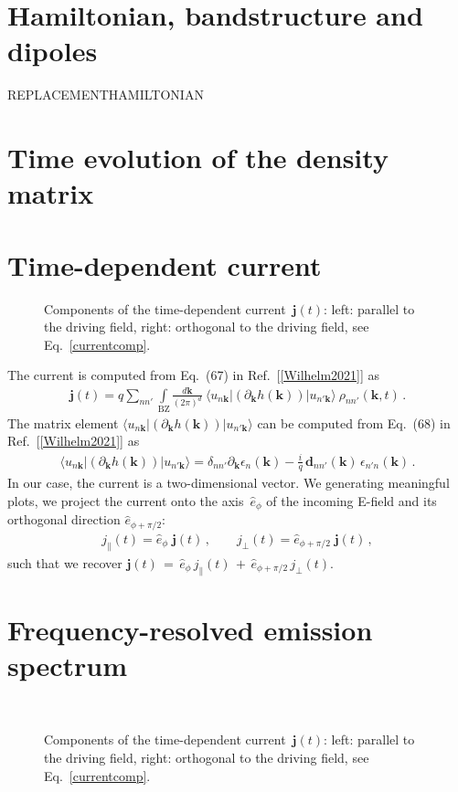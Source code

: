 \documentclass[11pt, a4paper]{scrartcl}
\newlength\figureheight
\newlength\figurewidth
\newcommand{\bk}{\mathbf{k}}
\newcommand{\bj}{\mathbf{j}}
\newcommand{\bd}{\mathbf{d}}
\newcommand{\eqt}{\,{=}\,}
\newcommand{\pt}{\,{+}\,}
\newcommand{\intbzdkpi}{\int\limits_\text{BZ}\frac{d\bk}{(2\pi)^d}}
\begin{document}
\newpage
\section{Hamiltonian, bandstructure and dipoles}
REPLACEMENTHAMILTONIAN


\section{Time evolution of the density matrix}

\section{Time-dependent current}
\begin{figure}[b!]
\centering
\setlength\figureheight{7.5cm} 
\setlength\figurewidth{7.5cm}
\hfill
\caption{Components of the time-dependent current~$\bj(t)$: left: parallel to the driving field, right: orthogonal to the driving field, see Eq.~\eqref{currentcomp}.}
    \label{fig:current}
\end{figure}
The current is computed from Eq.~(67) in Ref.~[\ref{Wilhelm2021}] as
\begin{align}
 \bj(t)  =
q\sum_{nn'} \intbzdkpi
\ \langle u_{n\bk} |  (\partial_\bk h(\bk)) | u_{n'\bk}\rangle \ \rho_{nn'}(\bk,t)\,.\label{current}
\end{align} 
The matrix element $ \langle u_{n\bk} |  (\partial_\bk h(\bk)) | u_{n'\bk}\rangle$ can be computed from Eq.~(68) in Ref.~[\ref{Wilhelm2021}] as
\begin{align}
   \langle u_{n\bk} |  (\partial_\bk h(\bk)) | u_{n'\bk}\rangle  = \delta_{nn'}\partial_\bk\epsilon_n(\bk) 
   -\frac{i}{q}\, \bd_{nn'}(\bk)\,\epsilon_{n'n}(\bk) \,.
\end{align}
%
In our case, the current is a two-dimensional vector. 
%
We generating meaningful plots, we project the current onto the axis~$\hat{e}_\phi$ of the incoming E-field and its orthogonal direction $\hat{e}_{\phi+\pi/2}$:
\begin{align}
    j_{\parallel}(t) = \hat{e}_\phi\;\bj(t)\,,\hspace{2em}
    j_{\bot}(t) = \hat{e}_{\phi+\pi/2}\;\bj(t)\,, 
    \label{currentcomp}
\end{align}
such that we recover $\bj(t)\eqt\hat{e}_\phi\, j_{\parallel}(t)\pt\hat{e}_{\phi+\pi/2}\,j_{\bot}(t)$.

\section{Frequency-resolved emission spectrum}
\begin{figure}[b!]
\centering
\setlength\figureheight{9cm} 
\setlength{}

\\[1.5em]

\caption{Components of the time-dependent current~$\bj(t)$: left: parallel to the driving field, right: orthogonal to the driving field, see Eq.~\eqref{currentcomp}.}
    \label{fig:current}
\end{figure}
\end{document}
